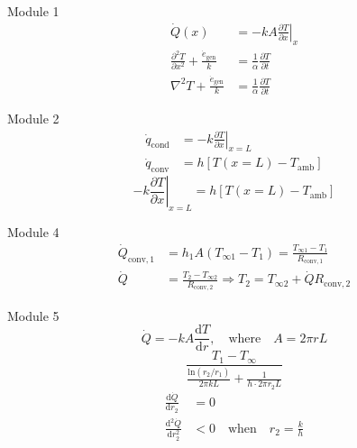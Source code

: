 \documentclass[24pt]{article}
\begin{document}
Module 1
\begin{align}
\dot{Q}(x) &= -kA\left.\frac{\partial T}{\partial x}\right|_x \\
\frac{\partial^2T}{\partial x^2} + \frac{\dot{e}_\mathrm{gen}}{k} &= \frac{1}{\alpha} \frac{\partial T}{\partial t} \\
\nabla^2 T + \frac{\dot{e}_\mathrm{gen}}{k} &= \frac{1}{\alpha} \frac{\partial T}{\partial t}
\end{align}

Module 2
\begin{align}
\dot{q}_\mathrm{cond} &= -k\left.\frac{\partial T}{\partial x}\right|_{x=L} \\
\dot{q}_\mathrm{conv} &= h[T(x=L)-T_\mathrm{amb}]
\end{align}
\begin{equation}
-k\left.\frac{\partial T}{\partial x}\right|_{x=L} = h[T(x=L)-T_\mathrm{amb}]
\end{equation}

Module 4
\begin{align}
\dot{Q}_{\mathrm{conv},1} &= h_1A(T_{\infty 1}-T_1) = \frac{T_{\infty 1}-T_1}{R_{\mathrm{conv},1}} \\
\dot{Q} &= \frac{T_2 - T_{\infty 2}}{R_{\mathrm{conv},2}} \Rightarrow T_2 = T_{\infty 2}+\dot{Q}R_{\mathrm{conv},2}
\end{align}

Module 5
\begin{equation}
\dot{Q} = -kA\frac{\mathrm{d}T}{\mathrm{d}r}, \quad \text{where} \quad A = 2\pi r L
\end{equation}
\begin{equation}
\frac{T_1 - T_\infty}{\frac{\mathrm{ln}(r_2/r_1)}{2\pi k L}+\frac{1}{h\cdot 2\pi r_2 L}}
\end{equation}
\begin{align}
\frac{\mathrm{d}\dot{Q}}{\mathrm{d}r_2} &= 0 \\
\frac{\mathrm{d}^2\dot{Q}}{\mathrm{d}r_2^2} &< 0 \quad \text{when} \quad r_2 = \frac{k}{h}
\end{align}
\end{document}
